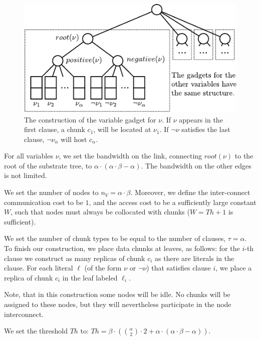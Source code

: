 \documentclass[preprint,12pt]{elsarticle}
\newcommand{\maciek}[1]{\textcolor{brown}{maciek: #1}}
\newcommand{\variab}{\nu}
\newcommand{\clauses}{\alpha}
\newcommand{\variables}{\beta}
\newcommand{\achunk}{\ensuremath{c}}
\newcommand{\Vms}{\ensuremath{n_V}}
\newcommand{\Thr}{\ensuremath{Th}}
\begin{document}
\begin{figure}
\includegraphics[width=\columnwidth]{figs/construction_3sat}
\caption{The construction of the variable gadget for $\nu$. If 
$\nu$ appears in the
first clause, a chunk $\achunk_1$, will be located at $\nu_1$. If $\neg \nu$
satisfies the last clause, $\neg
\nu_\alpha$ will host $\achunk_\alpha$.}
\label{fig:construction_3sat}
\end{figure}

For all variables $\nu$, we set the bandwidth
on the link, connecting $root(\nu)$ to the root of
the substrate tree, to $\clauses\cdot(\clauses\cdot\variables-\clauses)$. The bandwidth on the other
edges is not limited.


We set the number of nodes to $\Vms = \clauses \cdot \variables$.
Moreover, we define the inter-connect communication cost to be $1$,
and the access cost to be a sufficiently large constant $W$,
such that nodes must always be collocated with chunks ($W = \Thr + 1$ is
sufficient).


We set the number of chunk types to be equal to the number of clauses, $\tau =
\clauses$. To finish our construction, we place data chunks at
leaves, as follows: for the $i$-th clause we
construct as many replicas of chunk $\achunk_i$ as there are literals in the
clause. For each literal $\ell$ (of the form $\variab$ or $\neg \variab$) that satisfies clause $i$,
 we place
a replica of chunk $\achunk_i$ in the leaf labeled $\ell_i$.

Note, that in this construction some nodes will be idle. No chunks will be 
assigned to these nodes, but they will nevertheless participate in the node 
interconnect.

We set the threshold $\Thr$ to:
$ \Thr = \variables \cdot ({\clauses  \choose 2} \cdot 2 +
\clauses \cdot (\clauses
\cdot \variables - \clauses))$.
\end{document}
